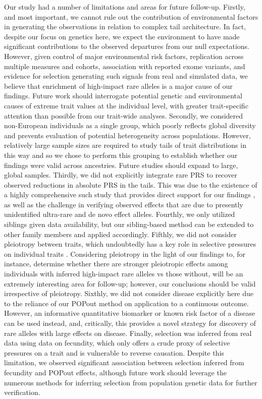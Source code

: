 \documentclass[12pt]{zHenriquesLab-StyleBioRxiv}
\begin{document}
Our study had a number of limitations and areas for future follow-up. 
Firstly, and most important, we cannot rule out the contribution of 
environmental factors in generating the observations in relation to 
complex tail architecture. In fact, despite our focus on genetics 
here, we expect the environment to have made significant contributions 
to the observed departures from our null expectations. However, 
given control of major environmental risk factors, replication across 
multiple measures and cohorts, association with reported exome variants, 
and evidence for selection generating such signals from real and simulated data, 
we believe that enrichment of high-impact rare alleles is a major cause of our findings. 
Future work should interrogate potential genetic and environmental causes of extreme trait
values at the individual level, with greater trait-specific attention than possible 
from our trait-wide analyses. Secondly, we considered non-European individuals 
as a single group, which poorly reflects global diversity and prevents evaluation 
of potential heterogeneity across populations. However, relatively large 
sample sizes are required to study tails of trait distributions in this 
way and so we chose to perform this grouping to establish whether our 
findings were valid across ancestries. Future studies should expand to large, 
global samples. Thirdly, we did not explicitly integrate rare PRS to recover observed 
reductions in absolute PRS in the tails. This was due to the existence of a highly 
comprehensive such study that provides direct support for our findings \cite{Fiziev2023}, 
as well as the challenge in verifying observed effects that are due to 
presently unidentified ultra-rare and  de novo effect alleles. 
Fourthly, we only utilized siblings given data availability, but our
sibling-based method can be extended to other family members \cite{Souaiaia2024}
and applied accordingly. Fifthly, we did not consider pleiotropy between 
traits, which undoubtedly has a key role in selective pressures on individual traits \cite{Barghi2020}. 
Considering pleiotropy in the light of our findings to, for instance, determine 
whether there are stronger pleiotropic effects among individuals with 
inferred high-impact rare alleles vs those without, will be an extremely 
interesting area for follow-up; however, our conclusions should be valid 
irrespective of pleiotropy. Sixthly, we did not consider disease explicitly 
here due to the reliance of our POPout method on application to a continuous outcome. 
However, an informative quantitative biomarker or known risk factor of a 
disease can be used instead, and, critically, this provides a novel strategy 
for discovery of rare alleles with large effects on disease. 
Finally, selection was inferred from real data using data on fecundity, 
which only offers a crude proxy of selective pressures on a trait and 
is vulnerable to reverse causation. Despite this limitation, 
we observed significant association between selection inferred 
from fecundity and POPout effects, although future work should leverage 
the numerous methods for inferring selection from population genetic data for further verification. 
\end{document}

